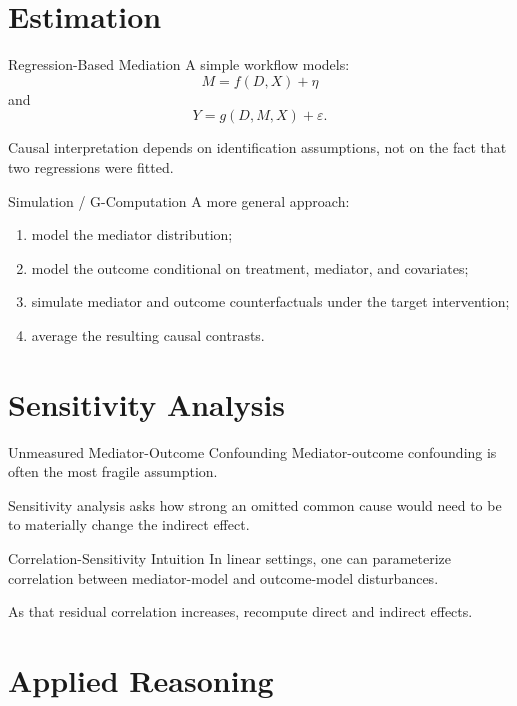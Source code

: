 \documentclass[aspectratio=169,11pt]{beamer}
\begin{document}
\section{Estimation}

\begin{frame}{Regression-Based Mediation}
A simple workflow models:
\[
M=f(D,X)+\eta
\]
and
\[
Y=g(D,M,X)+\varepsilon.
\]

Causal interpretation depends on identification assumptions, not on the fact that two regressions were fitted.
\end{frame}

\begin{frame}{Simulation / G-Computation}
A more general approach:
\begin{enumerate}
\item model the mediator distribution;
\item model the outcome conditional on treatment, mediator, and covariates;
\item simulate mediator and outcome counterfactuals under the target intervention;
\item average the resulting causal contrasts.
\end{enumerate}
\end{frame}

\section{Sensitivity Analysis}

\begin{frame}{Unmeasured Mediator-Outcome Confounding}
Mediator-outcome confounding is often the most fragile assumption.

Sensitivity analysis asks how strong an omitted common cause would need to be to materially change the indirect effect.
\end{frame}

\begin{frame}{Correlation-Sensitivity Intuition}
In linear settings, one can parameterize correlation between mediator-model and outcome-model disturbances.

As that residual correlation increases, recompute direct and indirect effects.
\end{frame}

\section{Applied Reasoning}
\end{document}
